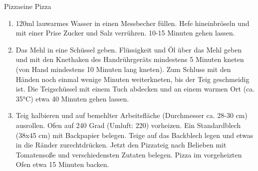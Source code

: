 \documentclass{article}
\begin{document}
\begin{recipe}{Pizza}{eine Pizza}{}


\begin{enumerate}
\item 120ml lauwarmes Wasser in einen Messbecher füllen. Hefe hineinbröseln und mit einer Prise Zucker und Salz verrühren. 10-15 Minuten gehen lassen.
\item Das Mehl in eine Schüssel geben. Flüssigkeit und Öl über das Mehl geben und mit den Knethaken des Handrührgeräts mindestens 5 Minuten kneten (von Hand mindestens 10 Minuten lang kneten). Zum Schluss mit den Händen noch einmal wenige Minuten weiterkneten, bis der Teig geschmeidig ist. Die Teigschüssel mit einem Tuch abdecken und an einem warmen Ort (ca. 35°C) etwa 40 Minuten gehen lassen.
\item Teig halbieren und auf bemehlter Arbeitsfläche  (Durchmesser ca. 28-30 cm)  ausrollen. Ofen auf 240 Grad (Umluft: 220) vorheizen. Ein Standardblech (38x45 cm) mit Backpapier belegen. Teige auf das Backblech legen und etwas in die Ränder zurechtdrücken. Jetzt den Pizzateig nach Belieben mit Tomatensoße und verschiedensten Zutaten belegen. Pizza im vorgeheizten Ofen etwa 15 Minuten backen.
\end{enumerate}
\end{recipe}
\end{document}

